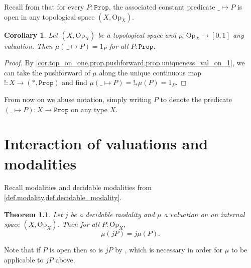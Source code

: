 \documentclass[11pt, oneside, article]{memoir}
\theoremstyle{plain}
\newtheorem{theorem}{Theorem}[chapter] %
\newtheorem{corollary}[theorem]{Corollary}
\theoremstyle{definition}
\theoremstyle{remark}
\newcommand{\const}[1]{\mathtt{#1}}
\newcommand{\Set}[1]{\mathrm{#1}}
\newcommand{\ind}[1]{1_{#1}}
\newcommand{\prop}{\const{Prop}}
\newcommand{\Op}{\Set{Op}}
\begin{document}
Recall from  that for every $P : \prop$, the associated constant predicate $\_ \mapsto P$ is open in any topological space $(X,\Op_X)$. 

\begin{corollary}\label{cor.val_const_indicator}
	Let $(X,\Op_X)$ be a topological space and $\mu : \Op_X \to [0,1]$ any valuation. Then $\mu(\,\_\mapsto P) = \ind{P}$ for all $P : \prop$.
\end{corollary}

\begin{proof}
	By \cref{cor.top_on_one,prop.pushforward,prop.uniqueness_val_on_1}, we can take the pushforward of $\mu$ along the unique continuous map $!\colon X\to (*,\prop)$ and find $\mu(\_\mapsto P)=!_*\mu(P)=\ind{P}$.
\end{proof}

From now on we abuse notation, simply writing $P$ to denote the predicate $(\_\mapsto P)\colon X\to\prop$ on any type $X$.

\chapter{Interaction of valuations and modalities}


Recall modalities and decidable modalities from \cref{def.modality,def.decidable_modality}. 
\begin{theorem}
	\label{vals_vs_modalities}
	Let $j$ be a decidable modality and $\mu$ a valuation on an internal space $(X,\Op_X)$. Then for all $P : \Op_X$,
	\[
		\mu(jP) = j \mu(P).	
	\]
\end{theorem}

Note that if $P$ is open then so is $jP$ by , which is necessary in order for $\mu$ to be applicable to $jP$ above.
\end{document}
